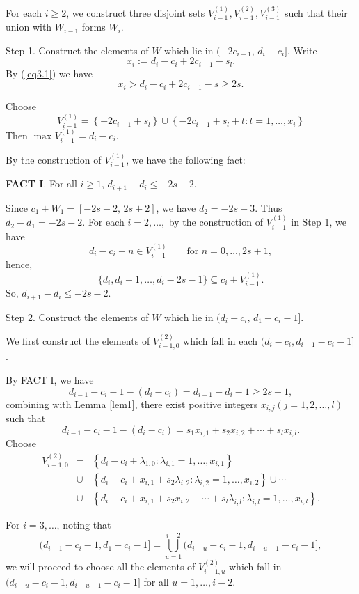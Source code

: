 \documentclass[12pt]{article}
\numberwithin{equation}{section}
\begin{document}
For each $i\ge 2$, we construct three disjoint sets
$V_{i-1}^{(1)}, V_{i-1}^{(2)}, V_{i-1}^{(3)}$ such that their union
with $W_{i-1}$ forms $W_i$.

Step 1. Construct the elements of $W$ which lie in $(-2c_{i-1},\, d_i-c_i]$. Write $$x_i:=d_i-c_i+2c_{i-1}-s_l.$$
By (\ref{eq3.1}) we have
$$x_i>d_i-c_i+2c_{i-1}-s\geqslant 2s.$$

Choose
\begin{equation}\label{eq3.2}V_{i-1}^{(1)}=\left\{-2c_{i-1}+s_l\right\}
\cup\left\{ -2c_{i-1}+s_l+t:t=1,\ldots,x_{i}\right\}
\end{equation}
Then $\max V_{i-1}^{(1)} = d_i-c_i$.

By the construction of $V_{i-1}^{(1)}$, we have the following fact:

{\bf FACT I}. For all $i\geqslant 1$, $d_{i+1}-d_i \leqslant -2s-2$.

 Since $c_1+W_1 = [-2s-2,\,2s+2]$, we have $d_2 = -2s-3$. Thus $d_2-d_1=-2s-2$. For each $i=2,\ldots,$
by the construction of $V_{i-1}^{(1)}$ in Step 1, we have
\begin{equation}\label{Prop-1}
d_i-c_i-n\in V_{i-1}^{(1)}\qquad\text{for }n=0,\dots,2s+1,\tag{Prop-1}\end{equation}
hence,
$$\{d_i, d_i-1,\ldots,d_i-2s-1\}\subseteq c_i+V_{i-1}^{(1)}.$$
So, $d_{i+1}-d_i\leqslant -2s-2$.


Step 2. Construct the elements of $W$ which lie in $(d_i-c_i,\, d_1-c_i-1]$.

We first construct the elements of $V_{i-1,0}^{(2)}$ which fall in each $(d_i-c_i, d_{i-1}-c_i-1]$.

By FACT I, we have
$$d_{i-1}-c_{i}-1-\left(d_{i}-c_{i}\right)=d_{i-1}-d_{i}-1\geqslant 2s+1,$$
combining with Lemma \ref{lem1}, there exist positive integers $x_{i,j}(j=1,2,\ldots,l)$ such that
$$d_{i-1}-c_{i}-1-\left(d_{i}-c_{i}\right)=s_1x_{i,1}+s_2x_{i,2}+\cdots+s_lx_{i,l}.$$
Choose \begin{eqnarray}\label{eq3.3}V_{i-1,0}^{(2)}&=&\left\{d_{i}-c_{i}+\lambda_{1,0}: \lambda_{i,1}=1,\ldots,x_{i,1}\right\}
\\&\cup&\left\{d_{i}-c_{i}+x_{i,1}+s_2\lambda_{i,2}: \lambda_{i,2}=1,\ldots,x_{i,2}\right\}\cup\cdots\nonumber
\\&\cup&\left\{d_{i}-c_{i}+x_{i,1}+s_2x_{i,2}+\cdots+s_l\lambda_{i,l}: \lambda_{i,l}=1,\ldots,x_{i,l}\right\}.\nonumber\end{eqnarray}

For $i=3,\ldots$, noting that $$(d_{i-1}-c_{i}-1, d_{1}-c_{i}-1]=\bigcup\limits_{u=1}^{i-2}(d_{i-u}-c_{i}-1, d_{i-u-1}-c_{i}-1],$$
we will proceed to choose all the elements of $V_{i-1,u}^{(2)}$ which fall in $(d_{i-u}-c_{i}-1, d_{i-u-1}-c_{i}-1]$ for all $u=1,\ldots, i-2$.
\end{document}
